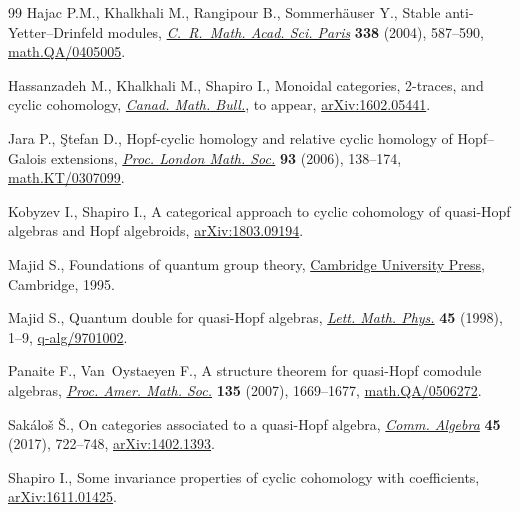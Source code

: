 \documentclass[10pt,a4paper]{amsart}
\numberwithin{equation}{section}
\begin{document}
\begin{thebibliography}{99}
Hajac P.M., Khalkhali M., Rangipour B., Sommerh\"auser Y., Stable
 anti-{Y}etter--{D}rinfeld modules, \href{https://doi.org/10.1016/j.crma.2003.11.037}{\textit{C.~R.~Math. Acad. Sci. Paris}}
 \textbf{338} (2004), 587--590, \href{https://arxiv.org/abs/math.QA/0405005}{math.QA/0405005}.

Hassanzadeh M., Khalkhali M., Shapiro I., Monoidal categories, 2-traces, and
 cyclic cohomology, \href{http://dx.doi.org/10.4153/CMB-2018-016-4}{\textit{Canad. Math. Bull.}}, {t}o appear,
 \href{https://arxiv.org/abs/1602.05441}{arXiv:1602.05441}.

Jara P., \c{S}tefan D., Hopf-cyclic homology and relative cyclic homology of
 {H}opf--{G}alois extensions, \href{https://doi.org/10.1017/S0024611506015772}{\textit{Proc. London Math. Soc.}} \textbf{93}
 (2006), 138--174, \href{https://arxiv.org/abs/math.KT/0307099}{math.KT/0307099}.

Kobyzev I., Shapiro I., A categorical approach to cyclic cohomology of
 quasi-{H}opf algebras and {H}opf algebroids, \href{https://arxiv.org/abs/1803.09194}{arXiv:1803.09194}.

Majid S., Foundations of quantum group theory, \href{https://doi.org/10.1017/CBO9780511613104}{Cambridge University Press},
 Cambridge, 1995.

Majid S., Quantum double for quasi-{H}opf algebras, \href{https://doi.org/10.1023/A:1007450123281}{\textit{Lett. Math. Phys.}}
 \textbf{45} (1998), 1--9, \href{https://arxiv.org/abs/q-alg/9701002}{q-alg/9701002}.

Panaite F., Van~Oystaeyen F., A structure theorem for quasi-{H}opf comodule
 algebras, \href{https://doi.org/10.1090/S0002-9939-07-08712-6}{\textit{Proc. Amer. Math. Soc.}} \textbf{135} (2007), 1669--1677,
 \href{https://arxiv.org/abs/math.QA/0506272}{math.QA/0506272}.

Sak\'alo\v{s} {\v{S}}., On categories associated to a quasi-{H}opf algebra,
 \href{https://doi.org/10.1080/00927872.2016.1175449}{\textit{Comm. Algebra}} \textbf{45} (2017), 722--748, \href{https://arxiv.org/abs/1402.1393}{arXiv:1402.1393}.

Shapiro I., Some invariance properties of cyclic cohomology with coefficients,
 \href{https://arxiv.org/abs/1611.01425}{arXiv:1611.01425}.

\end{thebibliography}
\end{document}

